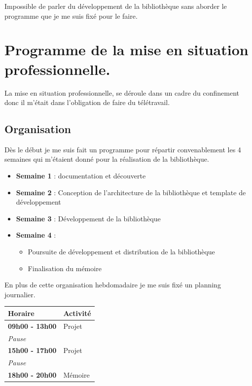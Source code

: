 \documentclass[11pt,a4paper,krantz2,11pt,oneside]{krantz}
\providecommand{\tightlist}{%
  \setlength{\itemsep}{0pt}\setlength{\parskip}{0pt}}
\begin{document}
Impossible de parler du développement de la bibliothèque sans aborder le programme que je me suis fixé pour le faire.

\hypertarget{programme-de-la-mise-en-situation-professionnelle.}{%
\section{Programme de la mise en situation professionnelle.}\label{programme-de-la-mise-en-situation-professionnelle.}}

La mise en situation professionnelle, se déroule dans un cadre du confinement donc il m'était dans l'obligation de faire du télétravail.

\hypertarget{organisation}{%
\subsection{Organisation}\label{organisation}}

Dès le début je me suis fait un programme pour répartir convenablement les 4 semaines qui m'étaient donné pour la réalisation de la bibliothèque.

\begin{itemize}
\tightlist
\item
  \textbf{Semaine 1} : documentation et découverte
\item
  \textbf{Semaine 2} : Conception de l'architecture de la bibliothèque et template de développement
\item
  \textbf{Semaine 3} : Développement de la bibliothèque
\item
  \textbf{Semaine 4} :

  \begin{itemize}
  \tightlist
  \item
    Poursuite de développement et distribution de la bibliothèque
  \item
    Finalisation du mémoire
  \end{itemize}
\end{itemize}

En plus de cette organisation hebdomadaire je me suis fixé un planning journalier.

\begin{longtable}[]{@{}ll@{}}
\toprule
Horaire & Activité\tabularnewline
\midrule
\endhead
\textbf{09h00 - 13h00} & Projet\tabularnewline
\emph{Pause} &\tabularnewline
\textbf{15h00 - 17h00} & Projet\tabularnewline
\emph{Pause} &\tabularnewline
\textbf{18h00 - 20h00} & Mémoire\tabularnewline
\bottomrule
\end{longtable}
\end{document}
